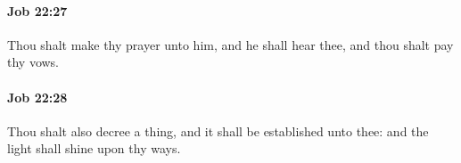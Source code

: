 		\paragraph{Job 22:27} %
			\label{JOB-22-27}

			Thou shalt make thy prayer unto him, and he shall hear thee, and thou shalt pay thy vows.


		\paragraph{Job 22:28} %
			\label{JOB-22-28}

			Thou shalt also decree a thing, and it shall be established unto thee: and the light shall shine upon thy ways.


